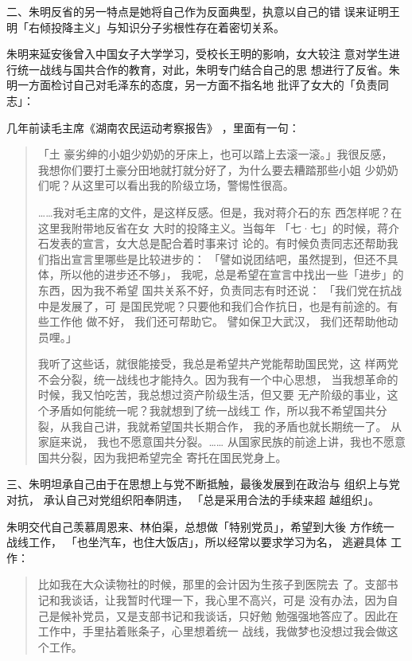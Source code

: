 二、朱明反省的另一特点是她将自己作为反面典型，执意以自己的错
误来证明王明「右倾投降主义」与知识分子劣根性存在着密切关系。

朱明来延安後曾入中国女子大学学习，受校长王明的影响，女大较注
意对学生进行统一战线与国共合作的教育，对此，朱明专门结合自己的思
想进行了反省。朱明一方面检讨自己对毛泽东的态度，另一方面不指名地
批评了女大的「负责同志」：

几年前读毛主席《湖南农民运动考察报告》
，里面有一句：
\begin{quote}
	
{\fzwkai 
「土
豪劣绅的小姐少奶奶的牙床上，也可以踏上去滚一滚。」我很反感，
我想你们要打土豪分田地就打就分好了，为什么要去糟踏那些小姐
少奶奶们呢？从这里可以看出我的阶级立场，警惕性很高。

……我对毛主席的文件，是这样反感。但是，我对蒋介石的东
西怎样呢？在这里我附带地反省在女 大时的投降主义。当每年
「七·七」的时候，蒋介石发表的宣言，女大总是配合着时事来讨
论的。有时候负责同志还帮助我们指出宣言里哪些是比较进步的：
「譬如说团结吧，虽然提到，但还不具体，所以他的进步还不够」，
我呢，总是希望在宣言中找出一些「进步」的东西，因为我不希望
国共关系不好，负责同志有时还说：
「我们党在抗战中是发展了，可
是国民党呢？只要他和我们合作抗日，也是有前途的。有些工作他
做不好，
我们还可帮助它。
譬如保卫大武汉，
我们还帮助他动员哩。」

我听了这些话，就很能接受，我总是希望共产党能帮助国民党，这
样两党不会分裂，统一战线也才能持久。因为我有一个中心思想，
当我想革命的时候，我又怕吃苦，我总想过资产阶级生活，但又要
无产阶级的事业，这个矛盾如何能统一呢？我就想到了统一战线工
作，所以我不希望国共分裂，从我自己讲，我就希望国共长期合作，
我的矛盾也就长期统一了。
从家庭来说，
我也不愿意国共分裂。……
从国家民族的前途上讲，我也不愿意国共分裂，因为我把希望完全
寄托在国民党身上。} 
\end{quote}

三、朱明坦承自己由于在思想上与党不断抵触，最後发展到在政治与
组织上与党对抗，
承认自己对党组织阳奉阴违，
「总是采用合法的手续来超
越组织」。

朱明交代自己羡慕周恩来、林伯渠，总想做「特别党员」，希望到大後 方作统一
战线工作， 「也坐汽车，也住大饭店」，所以经常以要求学习为名， 逃避具体
工作：
\begin{quote}
	
{\fzwkai 比如我在大众读物社的时候，那里的会计因为生孩子到医院去
了。支部书记和我谈话，让我暂时代理一下，我心里不高兴，可是
没有办法，因为自己是候补党员，又是支部书记和我谈话，只好勉
勉强强地答应了。因此在工作中，手里拈着账条子，心里想着统一
战线，我做梦也没想过我会做这个工作。} 
\end{quote}

